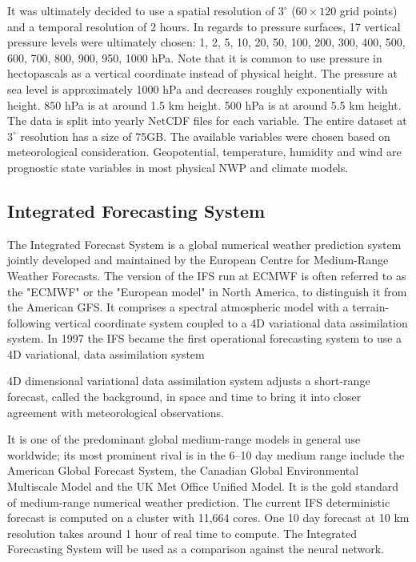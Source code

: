 It was ultimately decided to use a spatial resolution of $3^{\circ}$ ($60 \times 120$ grid points) and a temporal resolution of 2 hours. In regards to pressure surfaces, 17 vertical pressure levels were ultimately chosen:  1, 2, 5, 10, 20, 50, 100, 200, 300, 400, 500, 600, 700, 800, 900,  950, 1000 hPa. Note that it is common to use pressure in hectopascals as a vertical coordinate instead of physical height. The pressure at sea level is approximately 1000 hPa and decreases roughly exponentially with height. 850 hPa is at around 1.5 km height. 500 hPa is at around 5.5 km height. The data is split into yearly NetCDF files for each variable. The entire dataset at $3^{\circ}$ resolution has a size of 75GB. The available variables were chosen based on meteorological consideration. Geopotential, temperature, humidity and wind are prognostic state variables in most physical NWP and climate models\cite{rasp2020weatherbench}. 

\subsection{Integrated Forecasting System}\label{ifs_section}
The Integrated Forecast System is a global numerical weather prediction system jointly developed and maintained by the European Centre for Medium-Range Weather Forecasts. The version of the IFS run at ECMWF is often referred to as the "ECMWF" or the "European model" in North America, to distinguish it from the American GFS. It comprises a spectral atmospheric model with a terrain-following vertical coordinate system coupled to a 4D variational data assimilation system. In 1997 the IFS became the first operational forecasting system to use a 4D variational, data assimilation system

\begin{definition}
4D dimensional variational data assimilation system adjusts a short-range forecast, called the background, in space and time to bring it into closer agreement with meteorological observations.
\end{definition}

It is one of the predominant global medium-range models in general use worldwide; its most prominent rival is in the 6–10 day medium range include the American Global Forecast System, the Canadian Global Environmental Multiscale Model and the UK Met Office Unified Model. It is the gold standard of medium-range numerical weather prediction. The current IFS deterministic forecast is computed on a cluster with 11,664 cores. One 10 day forecast at 10 km resolution takes around 1 hour of real time to compute\cite{rasp2020weatherbench}. The Integrated Forecasting System will be used as a comparison against the neural network.

